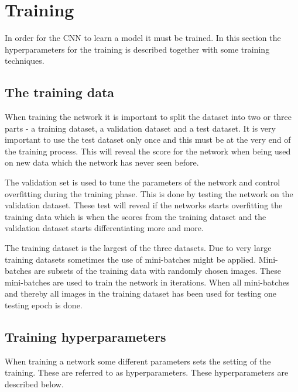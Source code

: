 \graphicspath{{Chapters/Project/}}

\section{Training} %
\label{sec:training}

In order for the CNN to learn a model it must be trained. In this section the
hyperparameters for the training is described together with some training
techniques.

\subsection{The training data} %
\label{sub:the_training_data}

When training the network it is important to split the dataset into two or three parts - a training dataset, a validation dataset and a test dataset. It is very important to use the test dataset only once and this must be at the very end of the training process. This will reveal the score for the network when being used on new data which the network has never seen before.

The validation set is used to tune the parameters of the network and control overfitting during the training phase. This is done by testing the network on the validation dataset. These test will reveal if the networks starts overfitting the training data which is when the scores from the training dataset and the validation dataset starts differentiating more and more.

The training dataset is the largest of the three datasets. Due to very large
training datasets sometimes the use of mini-batches might be applied.
Mini-batches are subsets of the training data with randomly chosen images. These mini-batches are used to train the network in iterations. When all mini-batches and thereby all images in the training dataset has been used for testing one testing epoch is done.


\subsection{Training hyperparameters} %
\label{sub:training_hyperparameters}

When training a network some different parameters sets the setting of the
training. These are referred to as hyperparameters. These hyperparameters are
described below.


